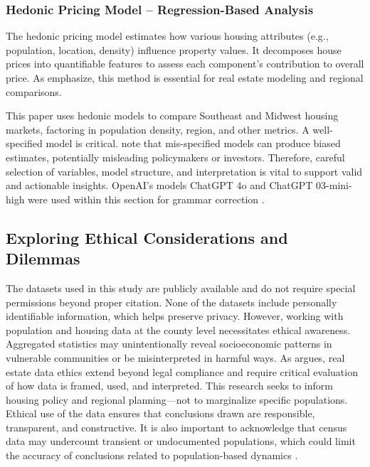 \documentclass[journal,article,submit,pdftex,moreauthors]{Definitions/mdpi}
\begin{document}
\subsubsection{Hedonic Pricing Model – Regression-Based Analysis} 
The hedonic pricing model estimates how various housing attributes (e.g., population, location, density) influence property values. It decomposes house prices into quantifiable features to assess each component’s contribution to overall price. As \citet{chau_2003_a} emphasize, this method is essential for real estate modeling and regional comparisons.

This paper uses hedonic models to compare Southeast and Midwest housing markets, factoring in population density, region, and other metrics. A well-specified model is critical. \citet{ekeland_2004_identification} note that mis-specified models can produce biased estimates, potentially misleading policymakers or investors. Therefore, careful selection of variables, model structure, and interpretation is vital to support valid and actionable insights. OpenAI’s models ChatGPT 4o and ChatGPT 03-mini-high were used within this section for grammar correction \citep{openai_2025_chatgpt}.

\subsection{Exploring Ethical Considerations and Dilemmas}

The datasets used in this study are publicly available and do not require special permissions beyond proper citation. None of the datasets include personally identifiable information, which helps preserve privacy. However, working with population and housing data at the county level necessitates ethical awareness. Aggregated statistics may unintentionally reveal socioeconomic patterns in vulnerable communities or be misinterpreted in harmful ways. As \citet{brinkmann_2009_putting} argues, real estate data ethics extend beyond legal compliance and require critical evaluation of how data is framed, used, and interpreted. This research seeks to inform housing policy and regional planning—not to marginalize specific populations. Ethical use of the data ensures that conclusions drawn are responsible, transparent, and constructive. It is also important to acknowledge that census data may undercount transient or undocumented populations, which could limit the accuracy of conclusions related to population-based dynamics \citep{cooper_2020_on}.
\end{document}

